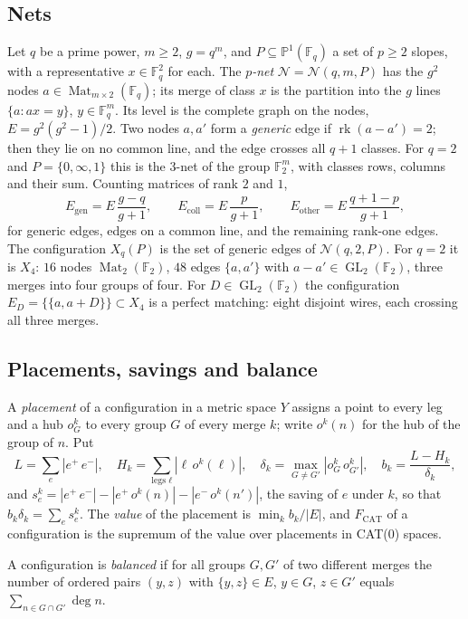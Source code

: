 \documentclass[10pt]{amsart}
\theoremstyle{plain}
\theoremstyle{definition}
\theoremstyle{remark}
\numberwithin{equation}{section}
\newcommand{\F}{\mathbb{F}}
\newcommand{\cN}{\mathcal{N}}
\newcommand{\rk}{\operatorname{rk}}
\newcommand{\Mat}{\operatorname{Mat}}
\newcommand{\GL}{\operatorname{GL}}
\newcommand{\Fcat}{F_{\mathrm{CAT}}}
\newcommand{\dd}[2]{|#1\,#2|}
\begin{document}
\subsection{Nets}\label{sec:nets}
Let $q$ be a prime power, $m\ge2$, $g=q^m$, and $P\subseteq\mathbb P^1(\F_q)$ a set of $p\ge2$ slopes,
with a representative $x\in\F_q^2$ for each. The \emph{$p$-net} $\cN=\cN(q,m,P)$ has the $g^2$ nodes
$a\in\Mat_{m\times2}(\F_q)$; its merge of class $x$ is the partition into the $g$ lines
$\{a:ax=y\}$, $y\in\F_q^m$. Its level is the complete graph on the nodes,
$E=g^2(g^2-1)/2$. Two nodes $a,a'$ form a \emph{generic} edge if $\rk(a-a')=2$; then they lie on no
common line, and the edge crosses all $q+1$ classes. For $q=2$ and $P=\{0,\infty,1\}$ this is the
3-net of the group $\F_2^m$, with classes rows, columns and their sum. Counting matrices of rank
$2$ and $1$,
\begin{equation}\label{eq:counts}
E_{\mathrm{gen}}=E\,\frac{g-q}{g+1},\qquad E_{\mathrm{coll}}=E\,\frac{p}{g+1},\qquad
E_{\mathrm{other}}=E\,\frac{q+1-p}{g+1},
\end{equation}
for generic edges, edges on a common line, and the remaining rank-one edges. The configuration
$X_q(P)$ is the set of generic edges of $\cN(q,2,P)$. For $q=2$ it is $X_4$: $16$ nodes $\Mat_2(\F_2)$,
$48$ edges $\{a,a'\}$ with $a-a'\in\GL_2(\F_2)$, three merges into four groups of four. For
$D\in\GL_2(\F_2)$ the configuration $E_D=\{\{a,a+D\}\}\subset X_4$ is a perfect matching: eight
disjoint wires, each crossing all three merges.

\subsection{Placements, savings and balance}
A \emph{placement} of a configuration in a metric space $Y$ assigns a point to every leg and a hub
$o^k_G$ to every group $G$ of every merge $k$; write $o^k(n)$ for the hub of the group of $n$. Put
\[
L=\sum_e\dd{e^+}{e^-},\quad H_k=\sum_{\text{legs }\ell}\dd{\ell}{o^k(\ell)},\quad
\delta_k=\max_{G\ne G'}\dd{o^k_G}{o^k_{G'}},\quad b_k=\frac{L-H_k}{\delta_k},
\]
and $s^k_e=\dd{e^+}{e^-}-\dd{e^+}{o^k(n)}-\dd{e^-}{o^k(n')}$, the saving of $e$ under $k$, so that
$b_k\delta_k=\sum_es^k_e$. The \emph{value} of the placement is $\min_kb_k/|E|$, and $\Fcat$ of a
configuration is the supremum of the value over placements in CAT(0) spaces.

\begin{definition}\label{def:balance}
A configuration is \emph{balanced} if for all groups $G,G'$ of two different merges the number of
ordered pairs $(y,z)$ with $\{y,z\}\in E$, $y\in G$, $z\in G'$ equals $\sum_{n\in G\cap G'}\deg n$.
\end{definition}
\end{document}
